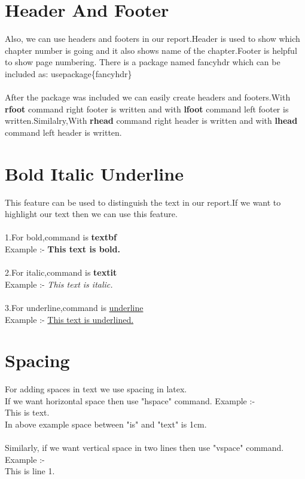 \documentclass{article}
\begin{document}
\section{Header And Footer}
Also, we can use headers and footers in our report.Header is used to show which chapter 		number is going and it also shows name of the chapter.Footer is helpful to show page 			numbering.
There is a package named fancyhdr which can be included as: usepackage\{fancyhdr\}\\\\
After the package was included we can easily create headers and footers.With 					\textbf{rfoot} command right footer is written and with \textbf{lfoot} command left 			footer is 						written.Similalry,With \textbf{rhead} command right 			header is written and with \textbf{lhead} command 		left header is written.

\newpage

\section{Bold Italic Underline}
This feature can be used to distinguish the text in our report.If we want to highlight our text then we can use this feature.\\\\
1.For bold,command is \textbf{textbf}\\
Example :- \textbf{This text is bold.}\\\\
2.For italic,command is \textbf{textit}\\
Example :- \textit{This text is italic.}\\\\
3.For underline,command is \underline{underline}\\
Example :- \underline{This text is underlined.}

\section{Spacing}
For adding spaces in text we use spacing in latex.\\
If we want horizontal space then use "hspace" command. Example :-\\
This is \hspace{1cm}text.\\
In above example space between "is" and "text" is 1cm.\\\\
Similarly, if we want vertical space in two lines then use "vspace" command. Example :-\\
This is line 1.
	
\end{document}
